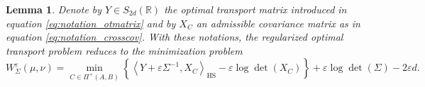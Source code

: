 \documentclass[]{article}
\DeclareMathOperator{\HS}{HS}
\numberwithin{equation}{section}
\theoremstyle{plain}
\newtheorem{lem}{Lemma}[section]
\begin{document}
\begin{lem}\label{lem:regot_matrix}
Denote by $Y \in S_{2d}(\mathbb{R})$ the optimal transport matrix introduced in equation \eqref{eq:notation_otmatrix} and by $X_C$ an admissible covariance matrix as in equation \eqref{eq:notation_crosscov}. With these notations, the regularized optimal transport problem reduces to the minimization problem
    \begin{equation}\label{eq:regeot_matrix_problem}
        W_\Sigma^{\varepsilon}(\mu, \nu) = \min_{C \in \Pi^{+}(A,B)} \left\{\left\langle Y + \varepsilon \Sigma^{-1}, X_C
         \right\rangle_{\HS} - \varepsilon \log \det (X_C) \right\} + \varepsilon \log \det (\Sigma) - 2 \varepsilon   d.
    \end{equation}
\end{lem}
\end{document}
